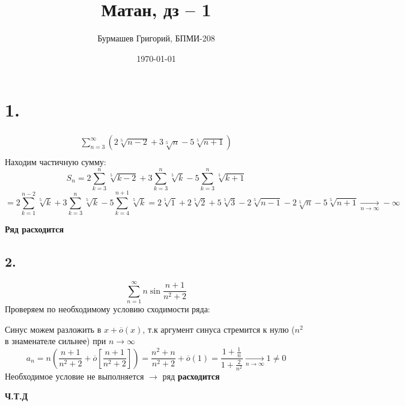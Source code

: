 \documentclass[a4paper,12pt]{article}
\author{Бурмашев Григорий, БПМИ-208}
\title{Матан, дз -- 1}
\date{\today}
\begin{document}
\maketitle
\section*{1.}
\begin{equation*}
\begin{gathered}
\sum_{n = 3}^{\infty} \left( 2 \sqrt[5]{n - 2} +3 \sqrt[5]{n} - 5 \sqrt[5]{n + 1} \right) \\
\end{gathered}
\end{equation*}
Находим частичную сумму:
\[
S_n =  2\sum_{k = 3}^{n}  \sqrt[5]{k - 2} + 3\sum_{k = 3}^{n} \sqrt[5]{k}- 5\sum_{k = 3}^{n} \sqrt[5]{k + 1} 
\]
\[
= 2 \sum_{k = 1}^{n - 2} \sqrt[5]{k} + 3 \sum_{k = 3}^{n} \sqrt[5]{k} - 5\sum_{k = 4}^{n + 1} \sqrt[5]{k} = 2 \sqrt[5]{1} + 2 \sqrt[5]{2} + 5 \sqrt[5]{3} - 2 \sqrt[5]{n - 1} - 2 \sqrt[5]{n}  - 5 \sqrt[5]{n + 1} \underset{n \rightarrow \infty}{\longrightarrow} - \infty
\]
\begin{center}
\textbf{Ряд расходится} 
\end{center}
\subsection*{2.}
\[
\sum_{n = 1}^{\infty} n \sin \frac{n + 1}{n^2 + 2}
\]
Проверяем по необходимому условию сходимости ряда:


Синус можем разложить в $x + \overline{o}(x)$, т.к аргумент синуса стремится к нулю ($n^2$ в знаменателе сильнее) при $n \rightarrow \infty$
\[
a_n = n \left(\frac{n + 1}{n^2 + 2} + \overline{o} \left[\frac{n + 1}{n^2 + 2} \right] \right) = \frac{n^2 + n}{n^2 + 2} + \overline{o}(1) = \frac{1 + \frac{1}{n}}{1 + \frac{2}{n^2}} \underset{n \rightarrow \infty}{\longrightarrow} 1 \neq 0 
\]
Необходимое условие не выполняется $\rightarrow$ ряд \textbf{расходится}
\begin{center}
\textbf{Ч.Т.Д} 
\end{center}
\end{document}
